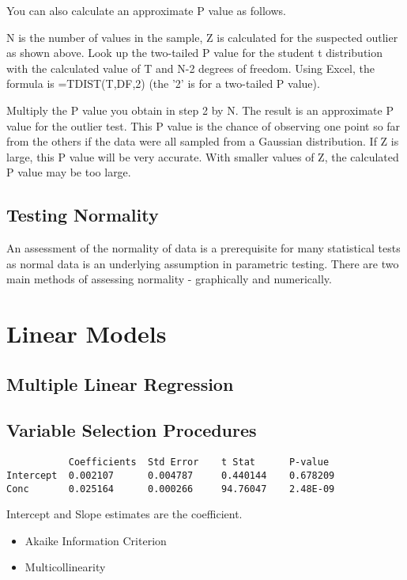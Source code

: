 \documentclass[12pt, a4paper]{report}
\theoremstyle{plain}
\theoremstyle{definition}
\theoremstyle{remark}
\begin{document}
You can also calculate an approximate P value as follows.


N is the number of values in the sample, Z is calculated for the suspected outlier as shown above.
Look up the two-tailed P value for the student t distribution with the calculated value of T and N-2 degrees of freedom. Using Excel, the formula is =TDIST(T,DF,2) (the '2' is for a two-tailed P value).


Multiply the P value you obtain in step 2 by N. The result is an approximate P value for the outlier test. This P value is the chance of observing one point so far from the others if the data were all sampled from a Gaussian distribution. If Z is large, this P value will be very accurate. With smaller values of Z, the calculated P value may be too large.






\section{Testing Normality}
An assessment of the normality of data is a prerequisite for many statistical tests as normal data is an underlying assumption in parametric testing. There are two main methods of assessing normality - graphically and numerically.


\chapter{Linear Models}
\section{Multiple Linear Regression}
\section{Variable Selection Procedures}

\begin{verbatim}
           Coefficients  Std Error    t Stat      P-value
Intercept  0.002107      0.004787     0.440144    0.678209
Conc       0.025164      0.000266     94.76047    2.48E-09
\end{verbatim}

Intercept and Slope estimates are the coefficient.

\begin{itemize}
\item Akaike Information Criterion
\item Multicollinearity
\end{itemize}
\end{document}
